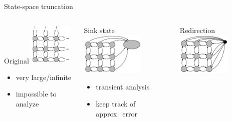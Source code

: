 \documentclass[9pt]{beamer}
\begin{document}
\begin{frame}{State-space truncation}
    \begin{columns}
        \begin{column}{.30\textwidth}
            \begin{block}{Original}
                \centering
                \vspace{3mm}
                \includegraphics[height=2cm]{../gfx/state_space_untrunc.pdf}
                {\small
                \begin{itemize}
                    \item very large/infinite
                    \item impossible to analyze
                \end{itemize}
                }
            \end{block}
        \end{column}
        \begin{column}{.30\textwidth}
            \begin{block}{Sink state}
                \centering
                \vspace{3mm}
                \includegraphics[height=2cm]{../gfx/state_space_redirected.pdf}
                {\small
                \begin{itemize}
                    \item transient analysis
                    \item keep track of approx.\ error
                \end{itemize}
                }
            \end{block}
        \end{column}
        \begin{column}{.30\textwidth}
            \begin{block}{Redirection}
                \centering
                \vspace{3mm}
                \includegraphics[height=2cm]{../gfx/state_space_reentry.pdf}

\end{block}
\end{column}
\end{columns}
\end{frame}
\end{document}
